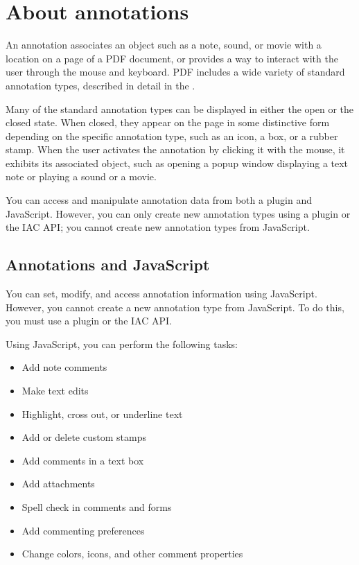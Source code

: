 \documentclass[letterpaper,12pt,english,openany,oneside]{sphinxmanual}
\begin{document}
\section{About annotations}
\label{\detokenize{Overview_CustomWorkflows:about-annotations}}
An annotation associates an object such as a note, sound, or movie with a location on a page of a PDF document, or provides a way to interact with the user through the mouse and keyboard. PDF includes a wide variety of standard annotation types, described in detail in the  .

Many of the standard annotation types can be displayed in either the open or the closed state. When closed, they appear on the page in some distinctive form depending on the specific annotation type, such as an icon, a box, or a rubber stamp. When the user activates the annotation by clicking it with the mouse, it exhibits its associated object, such as opening a pop\sphinxhyphen{}up window displaying a text note or playing a sound or a movie.

You can access and manipulate annotation data from both a plug\sphinxhyphen{}in and JavaScript. However, you can only create new annotation types using a plug\sphinxhyphen{}in or the IAC API; you cannot create new annotation types from JavaScript.


\subsection{Annotations and JavaScript}
\label{\detokenize{Overview_CustomWorkflows:annotations-and-javascript}}
You can set, modify, and access annotation information using JavaScript. However, you cannot create a new annotation type from JavaScript. To do this, you must use a plug\sphinxhyphen{}in or the IAC API.

Using JavaScript, you can perform the following tasks:
\begin{itemize}
\item {} 
Add note comments

\item {} 
Make text edits

\item {} 
Highlight, cross out, or underline text

\item {} 
Add or delete custom stamps

\item {} 
Add comments in a text box

\item {} 
Add attachments

\item {} 
Spell check in comments and forms

\item {} 
Add commenting preferences

\item {} 
Change colors, icons, and other comment properties

\end{itemize}
\end{document}
